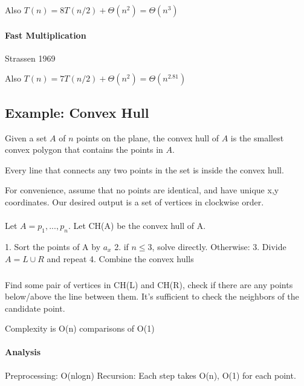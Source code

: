 \documentclass[a4paper]{article}
\begin{document}


Also $T(n)=8T(n/2)+\Theta(n^2)=\Theta(n^3)$

\paragraph{Fast Multiplication}

Strassen 1969


Also $T(n)=7T(n/2)+\Theta(n^2)=\Theta(n^{2.81})$


\subsection{Example: Convex Hull}

Given a set $A$ of $n$ points on the plane, the convex hull of $A$ is the smallest convex polygon that contains the points in $A$.

Every line that connects any two points in the set is inside the convex hull.

For convenience, assume that no points are identical, and have unique x,y coordinates. Our desired output is a set of vertices in clockwise order.

\paragraph{}
Let $A={p_1,...,p_n}$. Let CH(A) be the convex hull of A.

1. Sort the points of A by $a_x$
2. if $n \le 3$, solve directly. Otherwise:
3. Divide $A = L\cup R$ and repeat
4. Combine the convex hulls

\subparagraph{}
Find some pair of vertices in CH(L) and CH(R), check if there are any points below/above the line between them. It's sufficient to check the neighbors of the candidate point.


Complexity is O(n) comparisons of O(1)

\paragraph{Analysis}

Preprocessing: O(nlogn)
Recursion: Each step takes O(n), O(1) for each point.
\end{document}
